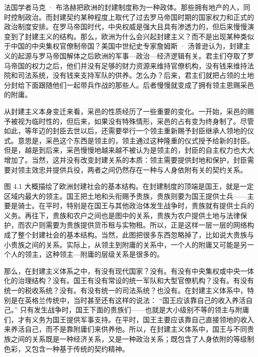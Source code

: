 法国学者马克 · 布洛赫把欧洲的封建制度称为一种政体。那些拥有地产的人，同时控制政治。而封建契约某种程度上取代了过去罗马帝国时期的国家权力和正式的政治制度安排。在罗马帝国时代，中央权威是强大且具有渗透力的，但后来慢慢演变到了封建主义的结构。那么，欧洲为什么会兴起封建主义？而不是出现某种类似于中国的中央集权官僚制帝国？美国中世纪史专家詹姆斯 · 汤普逊认为，封建主义的起源与罗马帝国解体之后欧洲的军事—政治—经济逻辑有关。君主们夺取了罗马帝国的权力之后，他们并没有足够的财力资源来维持官僚机构，没有钱来维持法院和司法系统，没有钱来支持军队的供养。怎么办？后来，君主们就把占领的土地分封给下面跟随他们一起带兵作战的那些人。后者慢慢就变成了拥有领主恩赐采邑的附庸。

从封建主义本身变迁来看，采邑的性质经历了一些重要的变化。一开始，采邑的赐予被视为临时性的，但后来，如果没有特殊情形，采邑的占有变为终身制了。尽管如此，等年迈的封臣去世以后，还需要举行一个领主重新赐予封臣继承人领地的仪式。意思是，采邑这个东西是领主的，领主通过这种隆重的仪式授予给新的封臣。但是，越是到后来，采邑慢慢地越来越不被认为是领主的，封臣的自主权力也大大增加了。当然，这并没有改变封建关系的本质：领主需要提供封地和保护，封臣需要对领主效忠并提供兵役，两者之间仍然存在一种与人身依附有关的契约关系。

图 4.1 大概描绘了欧洲封建社会的基本结构。在封建制度的顶端是国王，就是一定区域内最大的领主。国王把土地和头衔赐予贵族，贵族则要为国王提供士兵——主要是骑士。在平时，特别是在国王与其他政治体发生战争时，贵族就有提供士兵的义务。再往下，贵族和农户之间也是图中的关系，贵族为农户提供土地与法律保护，而农户则需要为贵族提供货币租与实物租。所以，正是这样一层一层的网络构成了整个封建社会的基本结构。当然，此图把很多东西忽略掉了，比如说大贵族与小贵族之间的关系。实际上，从领主到附庸的关系中，一个人的附庸又可能是另一个人的领主，这种领主—附庸的层级关系是很多的。

那么，在封建主义体系之中，有没有现代国家？没有。有没有中央集权或中央一体化的治理结构？没有。国王有没有常设的统一军队和大型官僚机构？没有。有没有统一的税收系统？没有。有没有统一的司法系统？也没有。在封建主义体系中，特别是在英格兰传统中，当时甚至还有这样的说法： “国王应该靠自己的收入养活自己。” 只有发生战争时，国王下面的贵族们——也就是大小级别不等的领主与附庸们，才有义务为国王提供军事支持。在平时，国王主要应该靠自己直接领地的收入来养活自己，而不是靠附庸们来供养他。所以，在封建主义体系中，国王与不同贵族之间的关系既是一种经济关系，又是一种政治关系；既包含了人身依附的等级制色彩，又包含一种基于传统的契约精神。

